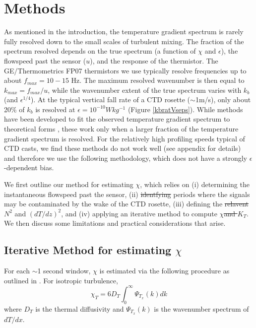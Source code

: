 \documentclass{ametsoc}
\providecommand{\DIFadd}[1]{{\protect\color{blue}\uwave{#1}}} %
\providecommand{\DIFdel}[1]{{\protect\color{red}\sout{#1}}}                      %
\providecommand{\DIFaddbegin}{} %
\providecommand{\DIFaddend}{} %
\providecommand{\DIFdelbegin}{} %
\providecommand{\DIFdelend}{} %
\begin{document}
\section{Methods}


As mentioned in the introduction, the temperature gradient spectrum is rarely fully resolved down to the small scales of turbulent mixing. The fraction of the spectrum resolved depends on the true spectrum (a function of $\chi$ and $\epsilon$), the flowspeed past the sensor ($u$), and the response of the thermistor. The GE/Thermometrics FP07 thermistors we use typically resolve frequencies up to about $f_{max}=10-15$ Hz. The maximum resolved wavenumber is then equal to $k_{max}=f_{max}/u$, while the wavenumber extent of the true spectrum varies with $k_b$ (and $\epsilon^{1/4}$). At the typical vertical fall rate of a CTD rosette ($\sim$1m/s), only about 20\% of $k_b$ is resolved at $\epsilon=10^{-10}Wkg^{-1}$ (Figure \ref{kbratVseps}). While methods have been developed to fit the observed temperature gradient spectrum to theoretical forms \citep{ruddicketal00}, these work only when a larger fraction of the temperature gradient spectrum is resolved. For the relatively high profiling speeds typical of CTD casts, we find these methods do not work well (see appendix for \DIFaddbegin \DIFadd{more }\DIFaddend details) and therefore we use the following methodology, which does not have a strongly $\epsilon$-dependent bias.

We first outline our method for estimating $\chi$, which relies on (i) determining the instantaneous flowspeed past the sensor, (ii) \DIFdelbegin \DIFdel{identfying }\DIFdelend \DIFaddbegin \DIFadd{identifying }\DIFaddend periods where the signals may be contaminated by the wake of the CTD rosette, (iii) defining the \DIFdelbegin \DIFdel{relavent }\DIFdelend \DIFaddbegin \DIFadd{relevant values of }\DIFaddend $N^2$ and $(dT/dz)^2$, and (iv) applying an iterative method to compute $\chi$\DIFdelbegin \DIFdel{and $K_T$}\DIFdelend . We then discuss some limitations and practical considerations that arise.

\subsection{Iterative Method for estimating $\chi$}

For each $\sim$1 second window, $\chi$ is estimated via the following procedure as outlined in \cite{moumnash09}. For isotropic turbulence,
\begin{equation}
\chi_T=6D_T \int_{0}^{\infty}\Psi_{T_x} (k) dk
\label{eq:chiint}
\end{equation}
where $D_T$ is the thermal diffusivity and $\Psi_{T_x} (k)$ is the wavenumber spectrum of $dT/dx$.
\end{document}
